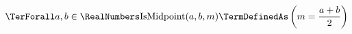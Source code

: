 
\hypertarget{def-interval-midpoint}{}
\begin{object}[Midpoint]
\[
\TerForall a, b \in \RealNumbers
\mathrm{IsMidpoint}(a, b, m) \TermDefinedAs \left( m = \frac{a + b}{2} \right)
\]
\end{object}